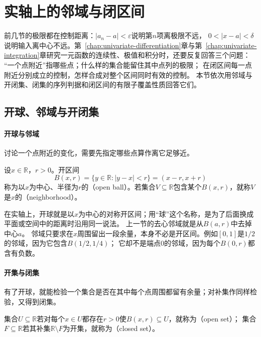 \section{实轴上的邻域与闭区间}
\label{sec:analysis-metric-measurement}
\label{sec:analysis-set-metric}

前几节的极限都在控制距离：$|a_n-a|<\varepsilon$说明第$n$项离极限不远，
$0<|x-a|<\delta$说明输入离中心不远。第~\ref{chap:univariate-differentiation}章与第~\ref{chap:univariate-integration}章研究一元函数的连续性、极值和积分时，还要反复回答三个问题：
“一个点附近”指哪些点；什么样的集合能留住其中点列的极限；
在闭区间每一点附近分别成立的控制，怎样合成对整个区间同时有效的控制。
本节依次用邻域与开闭集、闭集的序列判据和闭区间的有限子覆盖性质回答它们。

\subsection{开球、邻域与开闭集}

\paragraph{开球与邻域}
讨论一个点附近的变化，需要先指定哪些点算作离它足够近。

\begin{definition}[开球与邻域]
\label{def:analysis-open-ball}
设$x\in\mathbb R$，$r>0$。开区间
\[
 B(x,r)=\{y\in\mathbb R:|y-x|<r\}=(x-r,x+r)
\]
称为以$x$为中心、半径为$r$的（open ball）。若集合$V\subseteq\mathbb R$包含某个$B(x,r)$，就称$V$是$x$的（neighborhood）。
\end{definition}

在实轴上，开球就是以$x$为中心的对称开区间；用“球”这个名称，是为了后面换成平面或空间中的距离时沿用同一说法。
上一节的去心邻域就是从$B(a,r)$中去掉中心$a$。
邻域只要求在$x$周围留出一段余量，本身不必是开区间。例如$[0,1]$是$1/2$的邻域，因为它包含$B(1/2,1/4)$；
它却不是端点$0$的邻域，因为每个$B(0,r)$都含有负数。

\paragraph{开集与闭集}
有了开球，就能检验一个集合是否在其中每个点周围都留有余量；对补集作同样检验，又得到闭集。

\begin{definition}[开集与闭集]
\label{def:analysis-open-closed-sets}
集合$U\subseteq\mathbb R$若对每个$x\in U$都存在$r>0$使$B(x,r)\subseteq U$，就称为（open set）；
集合$F\subseteq\mathbb R$若其补集$\mathbb R\setminus F$为开集，就称为（closed set）。
\end{definition}

